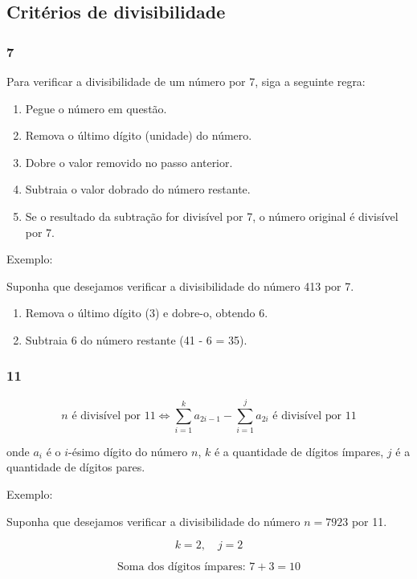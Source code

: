 \subsection{Critérios de divisibilidade}

\subsubsection{7}

Para verificar a divisibilidade de um número por 7, siga a seguinte regra:

\begin{enumerate}
  \item Pegue o número em questão.
  \item Remova o último dígito (unidade) do número.
  \item Dobre o valor removido no passo anterior.
  \item Subtraia o valor dobrado do número restante.
  \item Se o resultado da subtração for divisível por 7, o número original é divisível por 7.
\end{enumerate}

Exemplo:

Suponha que desejamos verificar a divisibilidade do número 413 por 7.

\begin{enumerate}
  \item Remova o último dígito (3) e dobre-o, obtendo 6.
  \item Subtraia 6 do número restante (41 - 6 = 35).
\end{enumerate}

\subsubsection{11}

\[
n \text{ é divisível por 11} \iff \sum_{i=1}^{k} a_{2i-1} - \sum_{i=1}^{j} a_{2i} \text{ é divisível por 11}
\]

onde \(a_{i}\) é o \(i\)-ésimo dígito do número \(n\), \(k\) é a quantidade de dígitos ímpares, \(j\) é a quantidade de dígitos pares.

Exemplo:

Suponha que desejamos verificar a divisibilidade do número \(n = 7923\) por 11.

\[
k = 2, \quad j = 2
\]

\[
\text{Soma dos dígitos ímpares: } 7 + 3 = 10
\]

